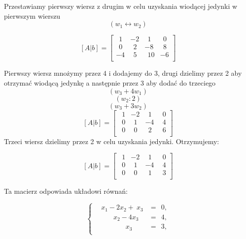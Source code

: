\documentclass[13pt, a4paper, titlepage]{article}
\begin{document}
Przestawiamy pierwszy wiersz z drugim w celu uzyskania wiodącej jedynki w pierwszym wierszu \begin{equation}(w_1 \leftrightarrow w_2)\end{equation}

    \[
   [A|b]=
  \left[ {\begin{array}{cccc}
   \ \ 1  &     -2    &  \ \  1   &     \ \  0      \\
   \ \ 0  &  \ \ 2    &      -8   &     \ \  8      \\
       -4 &  \ \ 5    &  \ \ 10   &         -6      \\
  \end{array} } \right]
    \]

    Pierwszy wiersz mnożymy przez 4 i dodajemy do 3, drugi dzielimy przez 2 aby otrzymać wiodącą jedynkę a następnie przez 3 aby dodać do trzeciego
    \begin{equation}(w_3 + 4w_1)\end{equation}
    \begin{equation}(w_2 : 2)\end{equation}
    \begin{equation}(w_3 + 3w_2)\end{equation}
    \[
   [A|b]=
  \left[ {\begin{array}{cccc}
   \ \ 1  &     -2    &  \ \  1   &     \ \  0      \\
   \ \ 0  &  \ \ 1    &      -4   &     \ \  4      \\
   \ \ 0  &  \ \ 0    &  \ \  2   &     \ \  6      \\
  \end{array} } \right]
    \]
    Trzeci wiersz dzielimy przez 2 w celu uzyskania jedynki. Otrzymujemy:

    \[
   [A|b]=
  \left[ {\begin{array}{cccc}
   \ \ 1  &     -2    &  \ \  1   &     \ \  0      \\
   \ \ 0  &  \ \ 1    &      -4   &     \ \  4      \\
   \ \ 0  &  \ \ 0    &  \ \  1   &     \ \  3      \\
  \end{array} } \right]
    \]

    Ta macierz odpowiada układowi równań:

     \begin{equation}
	\left\{	
	\begin{array}{ll}

\ \ \ \  x_1 -  2x_2 + \  x_3  &=\ \ 0, \\

\ \ \  \ \ \ \ \ \ \ \ \  x_2 -    4x_3  &=\ \ 4, \\
\ \ \ \ \ \ \ \ \ \ \ \ \ \ \ \ \ \ \ \ x_3  &=\ \ 3, \\
		
	\end{array} \right.
\end{equation}
\end{document}
